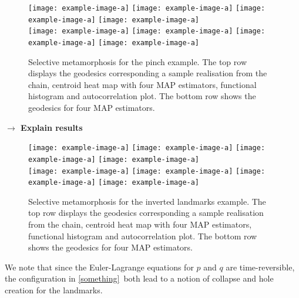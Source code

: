 \documentclass{article}
\begin{document}
\begin{figure}
\centering
\begin{minipage}{\textwidth}
  \centering
    \texttt{[image: example-image-a]}\quad
    \texttt{[image: example-image-a]}\quad
    \texttt{[image: example-image-a]}\quad
    \texttt{[image: example-image-a]}\\[0.25cm]
    \texttt{[image: example-image-a]}\quad
    \texttt{[image: example-image-a]}\quad
    \texttt{[image: example-image-a]}\quad
    \texttt{[image: example-image-a]}
    \caption{Selective metamorphosis for the pinch example. The top row displays
    the geodesics corresponding a sample realisation from the chain, centroid
    heat map with four MAP estimators, functional histogram and autocorrelation
    plot. The bottom row shows the geodesics for four MAP estimators.}
    \label{fig:selective:pinch}
\end{minipage}
\end{figure}

\textbf{$\longrightarrow$ Explain results}\\

\begin{figure}
\centering
\begin{minipage}{\textwidth}
  \centering
    \texttt{[image: example-image-a]}\quad
    \texttt{[image: example-image-a]}\quad
    \texttt{[image: example-image-a]}\quad
    \texttt{[image: example-image-a]}\\[0.25cm]
    \texttt{[image: example-image-a]}\quad
    \texttt{[image: example-image-a]}\quad
    \texttt{[image: example-image-a]}\quad
    \texttt{[image: example-image-a]}
    \caption{Selective metamorphosis for the inverted landmarks example. The top
    row displays the geodesics corresponding a sample realisation from the
    chain, centroid heat map with four MAP estimators, functional histogram and
    autocorrelation plot. The bottom row shows the geodesics for four MAP
    estimators.}
    \label{fig:selective:crossing}
\end{minipage}
\end{figure}

We note that since the Euler-Lagrange equations for $p$ and $q$ are
time-reversible, the configuration in \ref{something} both lead to a notion of
collapse and hole creation for the landmarks.\\
\end{document}
